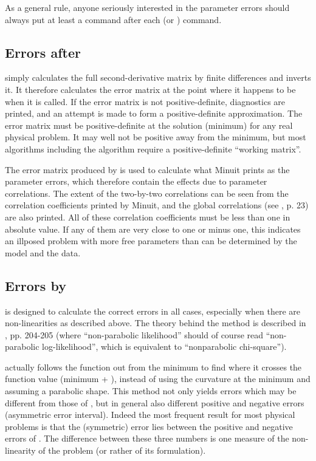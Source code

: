 As a general rule, anyone seriously interested in the parameter 
errors should always put at least a  command after each 
 (or ) command.
 
\subsection{Errors after \protect{}}
 
 simply calculates the full second-derivative matrix by finite 
differences and inverts it. It therefore calculates the error matrix 
at the point where it happens to be when it is called. If the error 
matrix is not positive-definite, diagnostics are printed, and an 
attempt is made to form a positive-definite approximation. The 
error matrix must be positive-definite at the solution (minimum) 
for any real physical problem. It may well not be positive away from 
the minimum, but most algorithms including the  algorithm 
require a positive-definite ``working matrix''.
 
The error matrix produced by  is used to calculate what Minuit 
prints as the parameter errors, which therefore contain the effects 
due to parameter correlations. The extent of the two-by-two 
correlations can be seen from the correlation coefficients printed by 
Minuit, and the global correlations (see \cite{bib-EADIE}, p. 23) are also 
printed. All of these correlation coefficients must be less than one 
in absolute value. If any of them are very close to one or minus one, 
this indicates an illposed problem with more free parameters than 
can be determined by the model and the data.
 
\subsection{Errors by \protect{}}
 
 is designed to calculate the correct errors in all cases, 
especially when there are non-linearities as described above. The 
theory behind the method is described in \cite{bib-EADIE}, pp. 204-205 
(where ``non-parabolic likelihood'' should of course read 
``non-parabolic log-likelihood'', 
which is equivalent to ``nonparabolic chi-square'').
 
 actually follows the function out from the minimum to find 
where it crosses the function value (minimum + ), instead of using 
the curvature at the minimum and assuming a parabolic shape. This 
method not only yields errors which may be different from those of 
, but in general also different positive and negative errors 
(asymmetric error interval). Indeed the most frequent result for 
most physical problems is that the (symmetric)  error lies 
between the positive and negative errors of . The difference 
between these three numbers is one measure of the non-linearity of 
the problem (or rather of its formulation).
 
